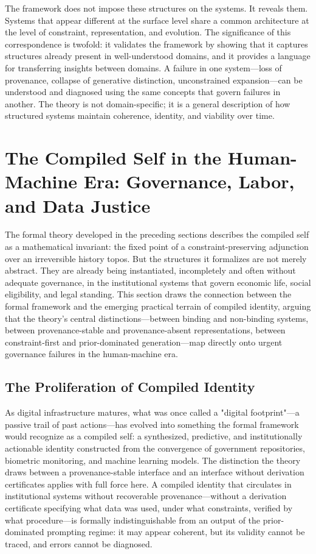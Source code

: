 \documentclass[12pt, a4paper]{article}
\theoremstyle{plain}
\theoremstyle{definition}
\theoremstyle{remark}
\begin{document}
The framework does not impose these structures on the systems. It reveals them. Systems that appear different at the surface level share a common architecture at the level of constraint, representation, and evolution. The significance of this correspondence is twofold: it validates the framework by showing that it captures structures already present in well-understood domains, and it provides a language for transferring insights between domains. A failure in one system---loss of provenance, collapse of generative distinction, unconstrained expansion---can be understood and diagnosed using the same concepts that govern failures in another. The theory is not domain-specific; it is a general description of how structured systems maintain coherence, identity, and viability over time.

\section{The Compiled Self in the Human-Machine Era: Governance, Labor, and Data Justice}

The formal theory developed in the preceding sections describes the compiled self as a mathematical invariant: the fixed point of a constraint-preserving adjunction over an irreversible history topos. But the structures it formalizes are not merely abstract. They are already being instantiated, incompletely and often without adequate governance, in the institutional systems that govern economic life, social eligibility, and legal standing. This section draws the connection between the formal framework and the emerging practical terrain of compiled identity, arguing that the theory's central distinctions---between binding and non-binding systems, between provenance-stable and provenance-absent representations, between constraint-first and prior-dominated generation---map directly onto urgent governance failures in the human-machine era.

\subsection{The Proliferation of Compiled Identity}

As digital infrastructure matures, what was once called a "digital footprint"---a passive trail of past actions---has evolved into something the formal framework would recognize as a compiled self: a synthesized, predictive, and institutionally actionable identity constructed from the convergence of government repositories, biometric monitoring, and machine learning models. The distinction the theory draws between a provenance-stable interface and an interface without derivation certificates applies with full force here. A compiled identity that circulates in institutional systems without recoverable provenance---without a derivation certificate specifying what data was used, under what constraints, verified by what procedure---is formally indistinguishable from an output of the prior-dominated prompting regime: it may appear coherent, but its validity cannot be traced, and errors cannot be diagnosed.
\end{document}
